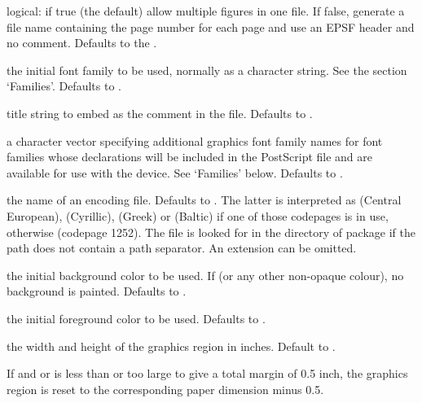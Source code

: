 \begin{Arguments}
\begin{ldescription}
\item[\code{onefile}] logical: if true (the default) allow multiple figures
in one file.  If false, generate a file name containing the page
number for each page and use an EPSF header and no
 comment.  Defaults to the .
\item[\code{family}] the initial font family to be used, normally as a
character string.  See the section `Families'.  Defaults to
.
\item[\code{title}] title string to embed as the  comment in the
file.  Defaults to .
\item[\code{fonts}] a character vector specifying additional \R{} graphics font
family names for font families whose declarations will be included
in the PostScript file and are available for use with the device.
See `Families' below.  Defaults to .
\item[\code{encoding}] the name of an encoding file.  Defaults to
.  The latter is interpreted as
 (Central European),  (Cyrillic),
 (Greek) or  (Baltic) if one
of those codepages is in use, otherwise 
(codepage 1252).
The file is looked for in the  directory of package
 if the path does not contain a path separator.  An
extension  can be omitted.

\item[\code{bg}] the initial background color to be used.  If
 (or any other non-opaque colour), no background
is painted.  Defaults to .
\item[\code{fg}] the initial foreground color to be used.  Defaults to
.
\item[\code{width, height}] the width and height of the graphics region in
inches.  Default to .

If  and  or  is less
than  or too large to give a total margin of 0.5 inch, the
graphics region is reset to the corresponding paper dimension minus 0.5.


\end{ldescription}
\end{Arguments}
